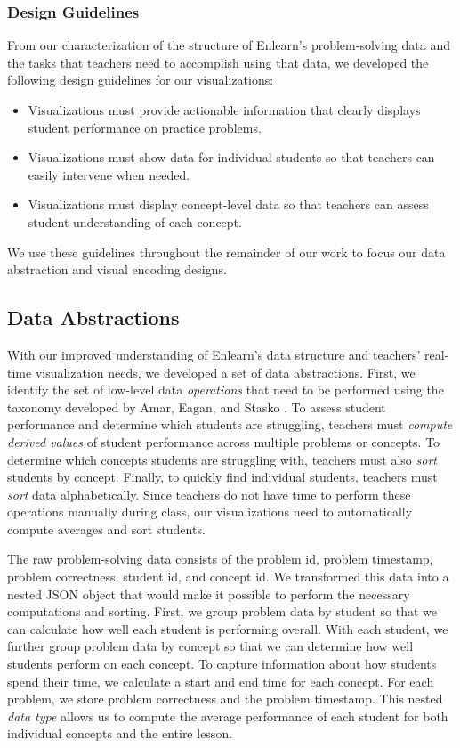 \documentclass{sigchi}
\begin{document}
\subsubsection{Design Guidelines}
From our characterization of the structure of Enlearn's problem-solving data and the tasks that teachers need to accomplish using that data, we developed the following design guidelines for our visualizations:

\begin{itemize} \itemsep5pt \parskip0pt 
  \item Visualizations must provide actionable information that clearly displays student performance on practice problems.
  \item Visualizations must show data for individual students so that teachers can easily intervene when needed.
  \item Visualizations must display concept-level data so that teachers can assess student understanding of each concept.
\end{itemize}

We use these guidelines throughout the remainder of our work to focus our data abstraction and visual encoding designs.

\subsection{Data Abstractions}
With our improved understanding of Enlearn's data structure and teachers' real-time visualization needs, we developed a set of data abstractions. First, we identify the set of low-level data \emph{operations} that need to be performed using the taxonomy developed by Amar, Eagan, and Stasko \cite{Amar05}. To assess student performance and determine which students are struggling, teachers must \emph{compute derived values} of student performance across multiple problems or concepts. To determine which concepts students are struggling with, teachers must also \emph{sort} students by concept. Finally, to quickly find individual students, teachers must \emph{sort} data alphabetically. Since teachers do not have time to perform these operations manually during class, our visualizations need to automatically compute averages and sort students.

The raw problem-solving data consists of the problem id, problem timestamp, problem correctness, student id, and concept id. We transformed this data into a nested JSON object that would make it possible to perform the necessary computations and sorting. First, we group problem data by student so that we can calculate how well each student is performing overall. With each student, we further group problem data by concept so that we can determine how well students perform on each concept. To capture information about how students spend their time, we calculate a start and end time for each concept. For each problem, we store problem correctness and the problem timestamp. This nested \emph{data type} allows us to compute the average performance of each student for both individual concepts and the entire lesson.
\end{document}
